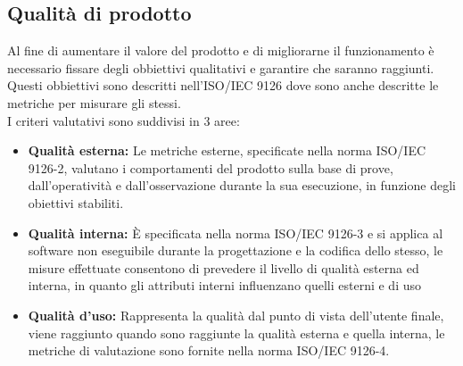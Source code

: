 \documentclass[a4paper]{article}
\begin{document}
			\subsection{Qualità di prodotto}
				Al fine di aumentare il valore del prodotto e di migliorarne il funzionamento è necessario fissare degli obbiettivi
				qualitativi e garantire che saranno raggiunti.\\
				Questi obbiettivi sono descritti nell'ISO/IEC 9126 dove sono anche descritte le metriche per misurare gli stessi.\\
				I criteri valutativi sono suddivisi in 3 aree:
				\begin{itemize}
					\item \textbf{Qualità esterna:} Le metriche esterne, specificate nella norma ISO/IEC 9126-2, valutano i
					comportamenti del prodotto sulla base di prove, dall'operatività e dall'osservazione durante la sua esecuzione,
					in funzione degli obiettivi stabiliti.
					\item \textbf{Qualità interna:} È specificata nella norma ISO/IEC 9126-3 e si applica al software non
					eseguibile durante la progettazione e la codifica dello stesso, le misure effettuate consentono di prevedere il
					livello di qualità esterna ed interna, in quanto gli attributi interni influenzano quelli esterni e di uso
					\item \textbf{Qualità d'uso:}  Rappresenta la qualità dal punto di vista dell'utente finale, viene raggiunto
					quando sono raggiunte la qualità esterna e quella interna, le metriche di valutazione sono fornite nella norma
					ISO/IEC 9126-4.
				\end{itemize}
				
\end{document}
